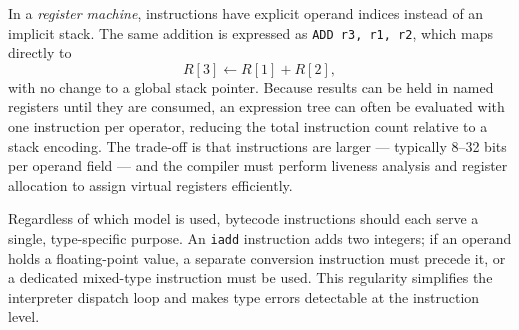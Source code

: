 In a \emph{register machine}, instructions have explicit operand indices instead of an implicit stack. The same addition is expressed as \texttt{ADD~r3,~r1,~r2}, which maps directly to
\[
R[3] \leftarrow R[1] + R[2],
\]
with no change to a global stack pointer. Because results can be held in named registers until they are consumed, an expression tree can often be evaluated with one instruction per operator, reducing the total instruction count relative to a stack encoding. The trade-off is that instructions are larger — typically 8--32 bits per operand field — and the compiler must perform liveness analysis and register allocation to assign virtual registers efficiently.

Regardless of which model is used, bytecode instructions should each serve a single, type-specific purpose. An \texttt{iadd} instruction adds two integers; if an operand holds a floating-point value, a separate conversion instruction must precede it, or a dedicated mixed-type instruction must be used. This regularity simplifies the interpreter dispatch loop and makes type errors detectable at the instruction level\cite{dragon-book}.
